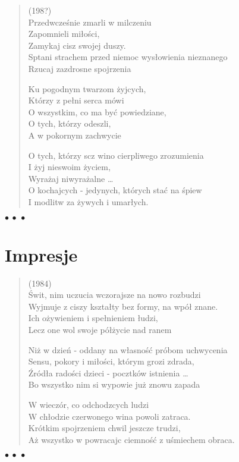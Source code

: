 \documentclass{article} %
\newenvironment{wierszd}[2]
	{\begin{verse} \hspace*{-1em}{\bf #1}\hfill{\small{(#2)}}\\[.5ex] }
	{\end{verse} \begin{center}$\bullet\ \bullet\ \bullet$\end{center}}
\newcommand{\chap}[1]{\newpage\section*{#1}}
\newcommand{\e}{\eob}
\renewcommand{\a}{\aob}
\renewcommand{\o}{\'{o}}
\newcommand{\n}{\'{n}}
\newcommand{\s}{\'{s}}
\renewcommand{\S}{\'{S}}
\newcommand{\ci}{\'{c}}
\newcommand{\Z}{\'{Z}}
\begin{document}
\begin{wierszd} {Cisza i {\s}piew II}{198?}
Przedwcze{\s}nie zmarli w milczeniu \\ 
Zapomnieli mi{\l}o{\s}ci, \\ 
Zamykaj{\a} cisz{\e} swojej duszy. \\ 
Sp{\e}tani strachem przed niemoc{\a} wys{\l}owienia nieznanego \\ 
Rzucaj{\a} zazdrosne spojrzenia 

	Ku pogodnym twarzom \.{z}yj{\a}cych, \\ 
	Kt{\o}rzy z pe{\l}ni serca m{\o}wi{\a} \\ 
	O wszystkim, co ma by{\ci} powiedziane, \\ 
	O tych, kt{\o}rzy odeszli, \\ 
	A w pokornym zachwycie 

O tych, kt{\o}rzy s{\a}cz{\a} wino cierpliwego zrozumienia \\ 
I \.{z}yj{\a} nieswoim \.{z}yciem, \\ 
Wyra\.{z}aj{\a} niwyra\.{z}alne \ldots \\ 
O kochaj{\a}cych - jedynych, kt{\o}rych sta{\ci} na {\s}piew \\ 
I modlitw{\e} za \.{z}ywych i umar{\l}ych.

\end{wierszd}\vspace*{-3ex}

\chap{Impresje}
%

\begin{wierszd} {Dzie{\n}} {1984}
{\S}wit, nim uczucia wczorajsze na nowo rozbudzi \\ 
Wyjmuje z ciszy kszta{\l}ty bez formy, na wp{\o}{\l} znane. \\ 
Ich o\.{z}ywieniem i spe{\l}nieniem {\l}udzi, \\ 
Lecz one wol{\a} swoje p{\o}{\l}\.{z}ycie nad ranem 

Ni\.{z} w dzie{\n} - oddany na w{\l}asno{\s}{\ci} pr{\o}bom uchwycenia \\ 
Sensu, pokory i mi{\l}o{\s}ci, kt{\o}rym grozi zdrada, \\ 
{\Z}r{\o}d{\l}a rado{\s}ci dzieci - pocz{\a}tk{\o}w istnienia \ldots \\ 
Bo wszystko nim si{\e} wypowie ju\.{z} znowu zapada 

W wiecz{\o}r, co odchodz{\a}cych ludzi \\ 
W ch{\l}odzie czerwonego wina powoli zatraca. \\ 
Kr{\o}tkim spojrzeniem chwil{\e} jeszcze trudzi, \\ 
A\.{z} wszystko w powracaj{\a}c{\a} ciemno{\s}{\ci} z u{\s}miechem obraca.
\end{wierszd}\vspace*{-2ex}
\end{document}
